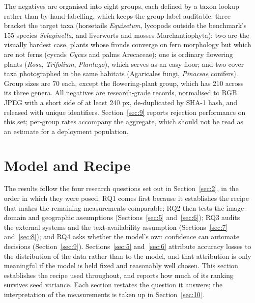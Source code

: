\documentclass[preprint,12pt,authoryear]{elsarticle}
\begin{document}
The negatives are organised into eight groups, each defined by a taxon lookup rather than by hand-labelling, which keeps the group label auditable: three bracket the target taxa (horsetails \emph{Equisetum}, lycopods outside the benchmark's 155 species \emph{Selaginella}, and liverworts and mosses Marchantiophyta); two are the visually hardest case, plants whose fronds converge on fern morphology but which are not ferns (cycads \emph{Cycas} and palms Arecaceae); one is ordinary flowering plants (\emph{Rosa}, \emph{Trifolium}, \emph{Plantago}), which serves as an easy floor; and two cover taxa photographed in the same habitats (Agaricales fungi, \emph{Pinaceae} conifers). Group sizes are 70 each, except the flowering-plant group, which has 210 across its three genera. All negatives are research-grade records, normalised to RGB JPEG with a short side of at least 240 px, de-duplicated by SHA-1 hash, and released with unique identifiers. Section~\ref{sec:9} reports rejection performance on this set; per-group rates accompany the aggregate, which should not be read as an estimate for a deployment population.

\setcounter{section}{3}

\section{Model and Recipe}\label{sec:4}

The results follow the four research questions set out in Section~\ref{sec:2}, in the order in which they were posed. RQ1 comes first because it establishes the recipe that makes the remaining measurements comparable; RQ2 then tests the image-domain and geographic assumptions (Sections~\ref{sec:5} and~\ref{sec:6}); RQ3 audits the external systems and the text-availability assumption (Sections~\ref{sec:7} and~\ref{sec:8}); and RQ4 asks whether the model's own confidence can automate decisions (Section~\ref{sec:9}). Sections~\ref{sec:5} and~\ref{sec:6} attribute accuracy losses to the distribution of the data rather than to the model, and that attribution is only meaningful if the model is held fixed and reasonably well chosen. This section establishes the recipe used throughout, and reports how much of its ranking survives seed variance. Each section restates the question it answers; the interpretation of the measurements is taken up in Section~\ref{sec:10}.

\setcounter{section}{4}

\setcounter{subsection}{0}
\end{document}
